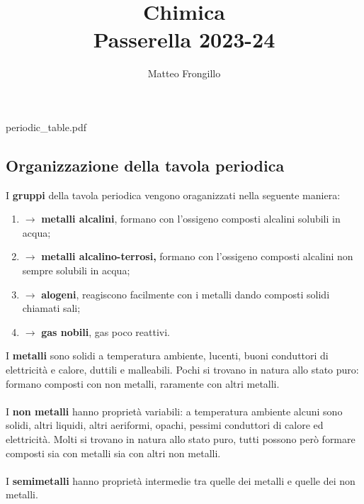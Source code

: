 \documentclass{article}
\title{\textbf{Chimica \\ Passerella 2023-24}}
\author{Matteo Frongillo}
\begin{document}
\maketitle
\tableofcontents

\begin{center}
    \begin{flushleft}
        
        {periodic_table.pdf}
    \end{flushleft}
\end{center}

\pagebreak

\subsection{Organizzazione della tavola periodica}
I \textbf{gruppi} della tavola periodica vengono oraganizzati nella seguente maniera:
\begin{enumerate}[label=\textbf{\Roman*}]
    \item $\rightarrow$ \textbf{metalli alcalini}, formano con l'ossigeno composti alcalini solubili in acqua;
    \item $\rightarrow$ \textbf{metalli alcalino-terrosi,} formano con l'ossigeno composti alcalini non
        sempre solubili in acqua;
    \item $\rightarrow$ \textbf{alogeni}, reagiscono facilmente con i metalli dando composti solidi chiamati sali;
    \item $\rightarrow$ \textbf{gas nobili}, gas poco reattivi.
\end{enumerate}
\vspace{.5cm}

I \textbf{metalli} sono solidi a temperatura ambiente, lucenti, buoni conduttori di elettricità
e calore, duttili e malleabili. Pochi si trovano in natura allo stato puro:
formano composti con non metalli, raramente con altri metalli.
\\ \\
I \textbf{non metalli} hanno proprietà variabili: a temperatura ambiente alcuni sono solidi,
altri liquidi, altri aeriformi, opachi, pessimi conduttori di calore ed elettricità.
Molti si trovano in natura allo stato puro, tutti possono però formare composti sia con metalli
sia con altri non metalli.
\\ \\
I \textbf{semimetalli} hanno proprietà intermedie tra quelle dei metalli e quelle dei non metalli.
\pagebreak
\end{document}
